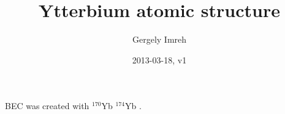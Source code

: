 \documentclass[12pt,a4paper]{article}
\author{Gergely Imreh}
\title{Ytterbium atomic structure}
\date{2013-03-18, v1}
\begin{document}
\maketitle

BEC was created with $^{170}$Yb\cite{Fukuhara2007} $^{174}$Yb\cite{Takasu2003} .



\end{document}
